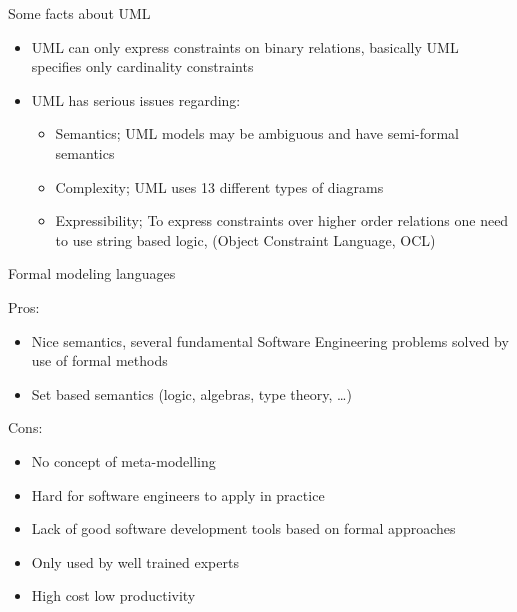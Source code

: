 \documentclass[slidetop,mathserif,red]{beamer}
\begin{document}
\begin{frame}{Some facts about UML}
    \begin{itemize}

    \item UML can only express constraints on binary relations, basically UML specifies only cardinality constraints

    \item UML has serious issues regarding:
        \begin{itemize}
        \item Semantics; UML models may be ambiguous and have
        semi-formal semantics
        \item Complexity; UML uses 13 different types of diagrams
        \item Expressibility; To express constraints over higher
        order relations one need to use string based logic, (Object Constraint Language, OCL)
        \end{itemize}
    \end{itemize}
\end{frame}



\begin{frame}{Formal modeling languages}

  Pros:
    \begin{itemize}
    \item Nice semantics, several fundamental
    Software Engineering
    problems solved by use of formal methods

    \item Set based semantics (logic, algebras, type theory, \ldots)
     \end{itemize}

   Cons:
   \begin{itemize}
    \item No concept of meta-modelling

    \item Hard for software engineers to apply in practice

    \item Lack of good software development tools based on formal
    approaches

    \item Only used by well trained experts

    \item High cost low productivity

    \end{itemize}
\end{frame}
\end{document}

